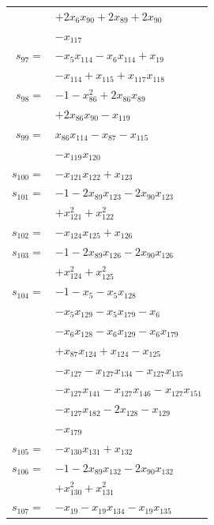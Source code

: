 \begin{longtable}{@{}r@{\;}l@{}}
 & \(\displaystyle +2x_{6}x_{90} +2x_{89} +2x_{90}\) \\
 & \(\displaystyle -x_{117}\) \\[3pt]
\(s_{97}=\) & \(\displaystyle -x_{5}x_{114} -x_{6}x_{114} +x_{19}\) \\
 & \(\displaystyle -x_{114} +x_{115} +x_{117}x_{118}\) \\[3pt]
\(s_{98}=\) & \(\displaystyle -1 -x_{86}^{2} +2x_{86}x_{89}\) \\
 & \(\displaystyle +2x_{86}x_{90} -x_{119}\) \\[3pt]
\(s_{99}=\) & \(\displaystyle x_{86}x_{114} -x_{87} -x_{115}\) \\
 & \(\displaystyle -x_{119}x_{120}\) \\[3pt]
\(s_{100}=\) & \(\displaystyle -x_{121}x_{122} +x_{123}\) \\[3pt]
\(s_{101}=\) & \(\displaystyle -1 -2x_{89}x_{123} -2x_{90}x_{123}\) \\
 & \(\displaystyle +x_{121}^{2} +x_{122}^{2}\) \\[3pt]
\(s_{102}=\) & \(\displaystyle -x_{124}x_{125} +x_{126}\) \\[3pt]
\(s_{103}=\) & \(\displaystyle -1 -2x_{89}x_{126} -2x_{90}x_{126}\) \\
 & \(\displaystyle +x_{124}^{2} +x_{125}^{2}\) \\[3pt]
\(s_{104}=\) & \(\displaystyle -1 -x_{5} -x_{5}x_{128}\) \\
 & \(\displaystyle -x_{5}x_{129} -x_{5}x_{179} -x_{6}\) \\
 & \(\displaystyle -x_{6}x_{128} -x_{6}x_{129} -x_{6}x_{179}\) \\
 & \(\displaystyle +x_{87}x_{124} +x_{124} -x_{125}\) \\
 & \(\displaystyle -x_{127} -x_{127}x_{134} -x_{127}x_{135}\) \\
 & \(\displaystyle -x_{127}x_{141} -x_{127}x_{146} -x_{127}x_{151}\) \\
 & \(\displaystyle -x_{127}x_{182} -2x_{128} -x_{129}\) \\
 & \(\displaystyle -x_{179}\) \\[3pt]
\(s_{105}=\) & \(\displaystyle -x_{130}x_{131} +x_{132}\) \\[3pt]
\(s_{106}=\) & \(\displaystyle -1 -2x_{89}x_{132} -2x_{90}x_{132}\) \\
 & \(\displaystyle +x_{130}^{2} +x_{131}^{2}\) \\[3pt]
\(s_{107}=\) & \(\displaystyle -x_{19} -x_{19}x_{134} -x_{19}x_{135}\) \\

\end{longtable}
